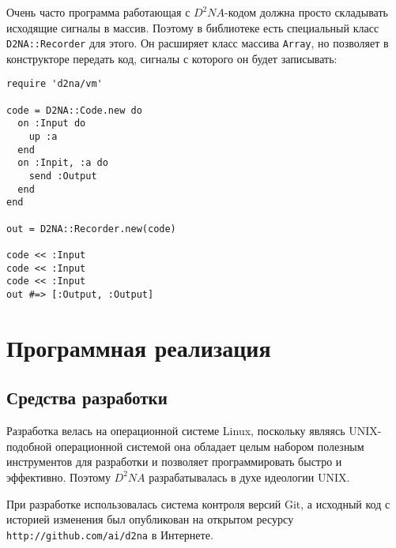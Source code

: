 \documentclass[utf8,a5paper,portrait,12pt]{eskdtext}
\begin{document}
Очень часто программа работающая с $D^2NA$-кодом должна просто складывать
исходящие сигналы в массив. Поэтому в библиотеке есть специальный класс
\texttt{D2NA::Recorder} для этого. Он расширяет класс массива \texttt{Array},
но позволяет в конструкторе передать код, сигналы с которого он будет
записывать:
\begin{verbatim}
require 'd2na/vm'

code = D2NA::Code.new do
  on :Input do
    up :a
  end
  on :Inpit, :a do
    send :Output
  end
end

out = D2NA::Recorder.new(code)

code << :Input
code << :Input
code << :Input
out #=> [:Output, :Output]
\end{verbatim}

\newpage
\section{Программная реализация}

\subsection{Средства разработки}

Разработка велась на операционной системе Linux, поскольку являясь UNIX-подобной
операционной системой она обладает целым набором полезным инструментов для
разработки и позволяет программировать быстро и эффективно. Поэтому $D^2NA$
разрабатывалась в духе идеологии UNIX.

При разработке использовалась система контроля версий Git, а исходный код с
историей изменения был опубликован на открытом ресурсу
\texttt{http://github.com/ai/d2na} в Интернете.
\end{document}
